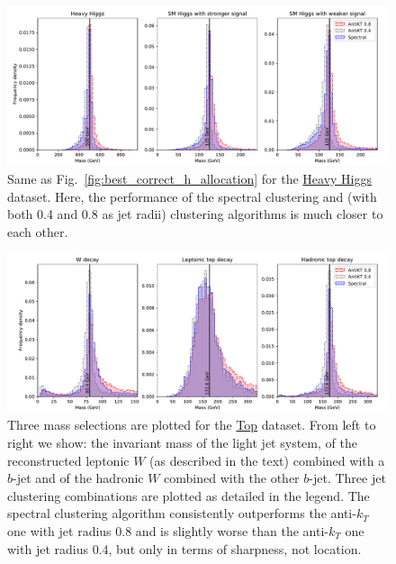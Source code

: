 \begin{figure}[htp]
    \includegraphics[width=1.\textwidth]{graphics/mass_peaks/heavy_long_correct_lines}
    \caption{Same as Fig.~\ref{fig:best_correct_h_allocation} for the \underline{Heavy Higgs} dataset. Here, the performance of the spectral clustering and \antikt{}
        (with both 0.4 and 0.8 as jet radii) clustering algorithms  is much closer to each other. 
}\label{fig:heavy_correct_mass_peaks}
\end{figure}    


\begin{figure}[htp]
    \includegraphics[width=1.\textwidth]{graphics/mass_peaks/top_long_correct_lines}
    \caption{Three mass selections are plotted for the \underline{Top} dataset. From left to right we show: the invariant mass of the light jet system, of the reconstructed leptonic $W$ (as  described in the text) combined with a $b$-jet and of the hadronic $W$ combined with the other $b$-jet. Three jet clustering combinations are plotted as detailed in the legend.
The spectral clustering algorithm  consistently outperforms the  anti-$k_T$ one with jet radius 0.8 and is slightly worse than the anti-$k_T$ one with jet radius 0.4, but only in terms of sharpness, not location.
    }\label{fig:top_correct_mass_peaks}
\end{figure}    

